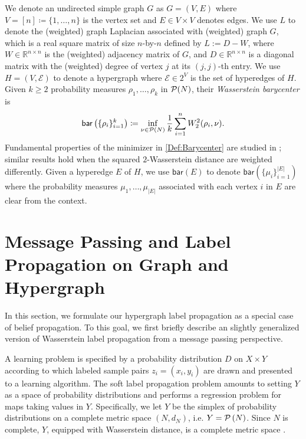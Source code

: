 \documentclass[letterpaper]{article} %
\begin{document}
 We denote an undirected simple graph $G$ as $G=(V, E)$ where $V=[n]\coloneqq\{1, \dots, n\}$ is the vertex set and $E\in V\times V$ denotes edges. We use $L$ to denote the (weighted) graph Laplacian associated with (weighted) graph $G$, which is a real square matrix of size $n$-by-$n$ defined by $L:=D-W$, where $W\in \mathbb{R}^{n\times n}$ is the (weighted) adjacency matrix of $G$, and $D\in \mathbb{R}^{n\times n}$ is a diagonal matrix with the (weighted) degree of vertex $j$ at its $\left( j,j \right)$-th entry. We use $H=(V, \mathcal E)$ to denote a hypergraph where $\mathcal E\in 2^V$ is the set of hyperedges of $H$. Given $k\geq 2$ probability measures $\rho_1, \dots, \rho_k$ in $\P(N)$, their \textit{Wasserstein barycenter} is %
\begin{equation}\label{Def:Barycenter}
    \mathsf{bar}\left(\{\rho_i\}_{i=1}^k\right)\coloneqq \inf_{\nu\in \P(N)}\frac{1}{k}\sum_{i=1}^nW_2^2(\rho_i, \nu).
\end{equation} 
Fundamental properties of the minimizer in \eqref{Def:Barycenter} are studied in \cite{Wasserstein_Barycenter}; similar results hold when the squared $2$-Wasserstein distance are weighted differently. Given a hyperedge $E$ of $H$, we use $\mathsf{bar}(E)$ to denote $\mathsf{bar}\left(\{\mu_i\}_{i=1}^{|E|}\right)$ where the probability measures $\mu_1, \dots, \mu_{|E|}$ associated with each vertex $i$ in 
$E$ are clear from the context.


\section{Message Passing and Label Propagation on Graph and Hypergraph}
In this section, we formulate our hypergraph label propagation as a special case of belief propagation. To this goal, we first briefly describe an slightly generalized version of Wasserstein label propagation \cite{Solomon:2014} from a message passing perspective.


A learning problem is specified by a probability distribution $D$ on $X\times Y$  according to which labeled sample pairs $z_i=\left( x_i,y_i \right)$ are drawn and presented to a learning algorithm. The soft label propagation problem amounts to setting $Y$ as a space of probability distributions and performs a regression problem for maps taking values in $Y$. Specifically, we let $Y$ be the simplex of probability distributions on a complete metric space $\left( N,d_N \right)$, i.e. $Y=\P\left( N \right)$. Since $N$ is complete, 
$Y$, equipped with Wasserstein distance, is a complete metric space \cite[Theorem 6.18]{villani2003topics}.
\end{document}
